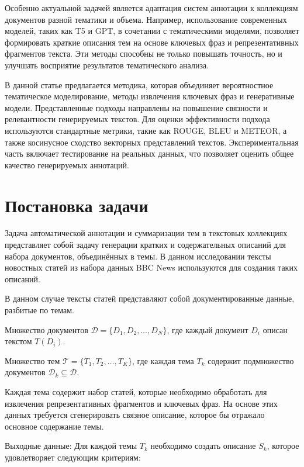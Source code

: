 \documentclass{article}
\begin{document}
Особенно актуальной задачей является адаптация систем аннотации к коллекциям документов разной тематики и объема. Например, использование современных моделей, таких как T5 и GPT, в сочетании с тематическими моделями, позволяет формировать краткие описания тем на основе ключевых фраз и репрезентативных фрагментов текста. Эти методы способны не только повышать точность, но и улучшать восприятие результатов тематического анализа. \cite{lau2011automatic}

В данной статье предлагается методика, которая объединяет вероятностное тематическое моделирование, методы извлечения ключевых фраз и генеративные модели. Представленные подходы направлены на повышение связности и релевантности генерируемых текстов. Для оценки эффективности подхода используются стандартные метрики, такие как ROUGE, BLEU и METEOR, а также косинусное сходство векторных представлений текстов. Экспериментальная часть включает тестирование на реальных данных, что позволяет оценить общее качество генерируемых аннотаций.

\section{Постановка задачи}

Задача автоматической аннотации и суммаризации тем в текстовых коллекциях представляет собой задачу генерации кратких и содержательных описаний для набора документов, объединённых в темы. \cite{langston2024automated} В данном исследовании тексты новостных статей из набора данных BBC News используются для создания таких описаний.

В данном случае тексты статей представляют собой документированные данные, разбитые по темам. 

Множество документов $ \mathcal{D} = \{D_1, D_2, \ldots, D_N\} $, где каждый документ $ D_i $ описан текстом $ T(D_i) $.

Множество тем $ \mathcal{T} = \{T_1, T_2, \ldots, T_K\} $, где каждая тема $ T_k $ содержит подмножество документов $ \mathcal{D}_k \subseteq \mathcal{D} $.

Каждая тема содержит набор статей, которые необходимо обработать для извлечения репрезентативных фрагментов и ключевых фраз. \cite{5langston2024automated} На основе этих данных требуется сгенерировать связное описание, которое бы отражало основное содержание темы.

\vspace{12pt}
Выходные данные:
Для каждой темы $ T_k $ необходимо создать описание $ S_k $, которое удовлетворяет следующим критериям:
\end{document}
